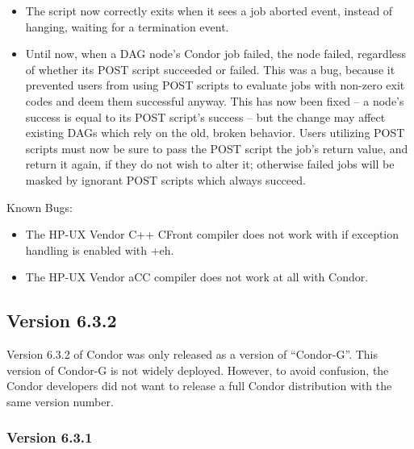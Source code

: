 \begin{itemize}
\item
The  script now correctly exits when it sees a job aborted
event, instead of hanging, waiting for a termination event.

\item
Until now, when a DAG node's Condor job failed, the node failed,
regardless of whether its POST script succeeded or failed.  This was a
bug, because it prevented users from using POST scripts to evaluate
jobs with non-zero exit codes and deem them successful anyway.  This
has now been fixed -- a node's success is equal to its POST script's
success -- but the change may affect existing DAGs which rely on the
old, broken behavior.  Users utilizing POST scripts must now be sure
to pass the POST script the job's return value, and return it again,
if they do not wish to alter it; otherwise failed jobs will be masked
by ignorant POST scripts which always succeed.

\end{itemize}

\noindent Known Bugs:

\begin{itemize}
\item The HP-UX Vendor C++ CFront compiler does not work with 
if exception handling is enabled with +eh.

\item The HP-UX Vendor aCC compiler does not work at all with Condor.
\end{itemize}

\subsection{\label{sec:New-6-3-2}Version 6.3.2}

Version 6.3.2 of Condor was only released as a version of
``Condor-G''.
This version of Condor-G is not widely deployed.
However, to avoid confusion, the Condor developers did not want to
release a full Condor distribution with the same version number.


\subsubsection{\label{sec:New-6-3-1}Version 6.3.1}

